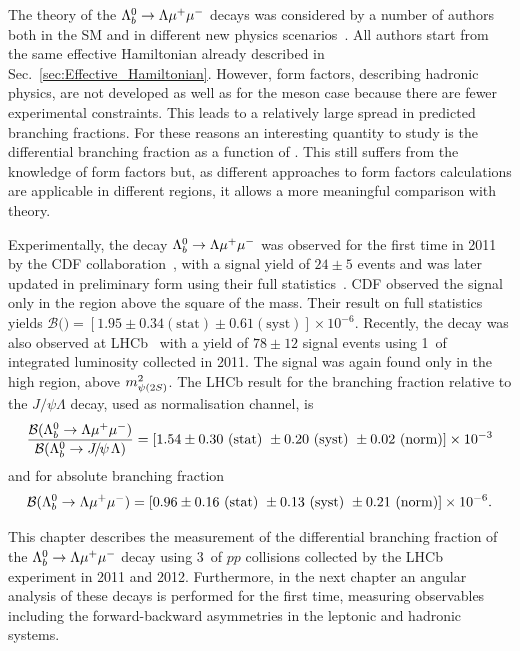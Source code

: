 The theory of the ${{\Lambda}^0_{b}}\rightarrow{\ensuremath{\Lambda}}{\ensuremath{\mu^+\mu^-}}$ decays was considered by a number of authors both in the SM and in different
new physics scenarios~\cite{Aslam:2008hp,Wang:2008sm,Huang:1998ek,Chen:2001ki,Chen:2001zc,Chen:2001sj,
Zolfagharpour:2007eh,Mott:2011cx,Aliev:2010uy,Mohanta:2010eb,Sahoo:2011yb}.
All authors start from the same effective Hamiltonian already described in Sec.~\ref{sec:Effective_Hamiltonian}. 
However, form factors, describing hadronic physics, are not developed as well as for the meson case 
because there are fewer experimental constraints. This leads to a relatively
large spread in predicted branching fractions. For these reasons an interesting quantity to study is the differential 
branching fraction as a function of \qsq. This still suffers from the knowledge of form factors but, as different 
approaches to form factors calculations are applicable in different \qsq regions, it allows a more meaningful comparison with theory.

Experimentally, the decay ${{\Lambda}^0_{b}}\rightarrow{\ensuremath{\Lambda}}{\ensuremath{\mu^+\mu^-}}$ was observed for the first time in 2011 by the CDF 
collaboration~\cite{Aaltonen:2011qs}, with a signal yield of $24\pm5$ events and was later updated in preliminary form using
their full statistics~\cite{Behari:2013xc}. CDF observed the signal only in the \qsq region above the square of the \psitwos mass.
Their result on full statistics yields $\mathcal{B}($\Lb\to\Lz\mumu$) =[1.95\pm0.34(\mathrm{stat})\pm0.61(\mathrm{syst})]\times 10^{-6}$.
Recently, the decay was also observed at LHCb~\cite{LHCb-PAPER-2013-025} with a yield of $78\pm12$ signal events
using 1~\invfb of integrated luminosity collected in 2011. The signal was again found only in the high \qsq region, above $m^2_{\psitwos}$.
The LHCb result for the branching fraction relative to the $J/\psi\Lambda$ decay, used as normalisation channel, is 
%
\begin{equation*}
\frac{\mathcal{B}(\Lb\to\Lz\mumu)}{\mathcal{B}(\Lb\to\jpsi\Lz)}=[1.54 \pm 0.30 ~(\mathrm{stat})~ \pm 0.20 ~(\mathrm{syst})~ \pm 0.02 ~(\mathrm{norm})]\times 10^{-3} 
\end{equation*}
and for absolute branching fraction
\begin{equation*}
\mathcal{B}({{\Lambda}^0_{b}}\rightarrow{\ensuremath{\Lambda}}{\ensuremath{\mu^+\mu^-}}) =[0.96 \pm 0.16 ~(\mathrm{stat})~ \pm 0.13 ~(\mathrm{syst})~ \pm 0.21 ~(\mathrm{norm})]\times 10^{-6}.
\end{equation*}

This chapter describes the measurement of the differential branching fraction
of the ${{\Lambda}^0_{b}}\rightarrow{\ensuremath{\Lambda}}{\ensuremath{\mu^+\mu^-}}$ decay using 3~\invfb of $pp$ collisions collected by the LHCb experiment in 2011 and 2012.
Furthermore, in the next chapter an angular analysis of these decays is performed for the first time, measuring observables
including the forward-backward asymmetries in the leptonic and hadronic systems.


